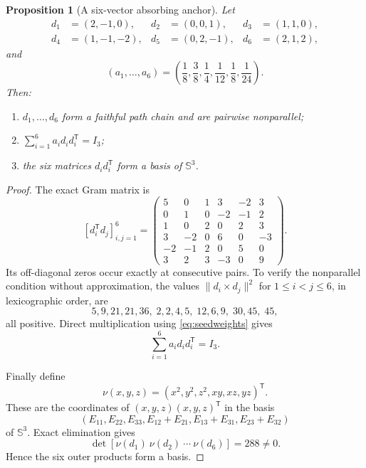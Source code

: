 \documentclass[11pt]{article}
\newtheorem{proposition}[theorem]{Proposition}
\theoremstyle{remark}
\newcommand{\Sn}{\mathbb{S}}
\begin{document}
\begin{proposition}[A six-vector absorbing anchor]\label{prop:anchor}
Let
\[
\begin{aligned}
 d_1&=(2,-1,0),      & d_2&=(0,0,1),       & d_3&=(1,1,0),\\
 d_4&=(1,-1,-2),     & d_5&=(0,2,-1),      & d_6&=(2,1,2),
\end{aligned}
\tag{4.1}\label{eq:seedvectors}
\]
and
\[
 (a_1,\ldots,a_6)
 =\left(\frac18,\frac38,\frac14,\frac1{12},\frac18,\frac1{24}\right).
\tag{4.2}\label{eq:seedweights}
\]
Then:
\begin{enumerate}[label=\textup{(\roman*)}]
\item $d_1,\ldots,d_6$ form a faithful path chain and are pairwise
      nonparallel;
\item $\sum_{i=1}^6 a_i d_i d_i^{\mathsf T}=I_3$;
\item the six matrices $d_i d_i^{\mathsf T}$ form a basis of $\Sn^3$.
\end{enumerate}
\end{proposition}

\begin{proof}
The exact Gram matrix is
\[
[d_i^{\mathsf T}d_j]_{i,j=1}^6=
\begin{pmatrix}
5&0&1&3&-2&3\\
0&1&0&-2&-1&2\\
1&0&2&0&2&3\\
3&-2&0&6&0&-3\\
-2&-1&2&0&5&0\\
3&2&3&-3&0&9
\end{pmatrix}.
\tag{4.3}\label{eq:gramseed}
\]
Its off-diagonal zeros occur exactly at consecutive pairs.  To verify the
nonparallel condition without approximation, the values
$\lVert d_i\times d_j\rVert^2$ for $1\le i<j\le6$, in lexicographic order,
are
\[
 5,9,21,21,36,\;2,2,4,5,\;12,6,9,\;30,45,\;45,
\]
all positive.  Direct multiplication using \eqref{eq:seedweights} gives
\[
             \sum_{i=1}^6 a_i d_i d_i^{\mathsf T}=I_3.
\tag{4.4}\label{eq:seedidentity}
\]

Finally define
\[
 \nu(x,y,z)=(x^2,y^2,z^2,xy,xz,yz)^{\mathsf T}.
\]
These are the coordinates of $(x,y,z)(x,y,z)^{\mathsf T}$ in the basis
\[
 (E_{11},E_{22},E_{33},E_{12}+E_{21},E_{13}+E_{31},E_{23}+E_{32})
\]
of $\Sn^3$.  Exact elimination gives
\[
 \det[\nu(d_1)\ \nu(d_2)\ \cdots\ \nu(d_6)]=288\ne0.
\tag{4.5}\label{eq:det288}
\]
Hence the six outer products form a basis.
\end{proof}
\end{document}
